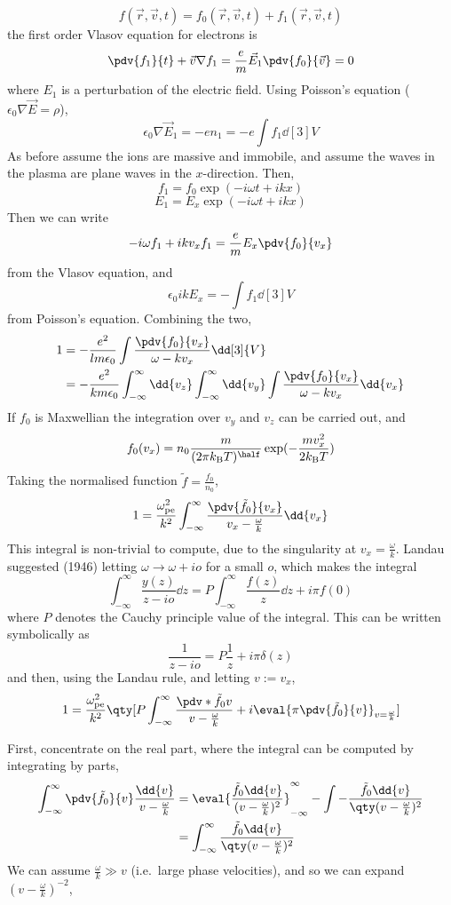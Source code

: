 \documentclass{book}         		                %
\begin{document}
\[ f(\vec{r}, \vec{v}, t) = f_0(\vec{r}, \vec{v}, t) + f_1(\vec{r},
\vec{v}, t) \]
the first order Vlasov equation for electrons is 
\[ \pdv{f_1}{t} + \vec{v} \nabla f_1 = \frac{e}{m} \vec{E}_1
\pdv{f_0}{\vec{v}} =0 \] where $E_1$ is a perturbation of the electric
field. Using Poisson's equation ($\epsilon_0 \nabla \vec{E} = \rho$),
\[ \epsilon_0 \nabla \vec{E}_1 = -e n_1 = -e \int f_1 \dd[3]{V} \] As
before assume the ions are massive and immobile, and assume the waves
in the plasma are plane waves in the $x$-direction. Then,
\[ f_1 = f_0 \exp(- i \omega t + i k x) \]
\[ E_1 = E_x \exp( - i \omega t + i k x) \]
Then we can write
\[ - i \omega f_1 + i k v_x f_1 = \frac{e}{m} E_x \pdv{f_0}{v_x} \]
from the Vlasov equation, and
\[ \epsilon_0 i k E_x = - \int f_1 \dd[3]{V} \]
from Poisson's equation. Combining the two,
\begin{align*}
  1 & = - \frac{e^2 }{l m \epsilon_0} \int \frac{\pdv{f_0}{v_x}}{\omega- k v_x} \dd[3]{V} \\
  &= - \frac{e^2}{k m \epsilon_0} \int_{-\infty}^{\infty} \dd{v_z}
  \int_{-\infty}^{\infty} \dd{v_y} \int \frac{\pdv{f_0}{v_x}}{\omega-
    k v_x} \dd{v_x}
\end{align*}
If $f_0$ is Maxwellian the integration over $v_y$ and $v_z$ can be carried out, and
\[ f_0(v_x) = n_0 \frac{m}{(2 \pi k_{\rm B} T)^{\half}} \exp( -
\frac{m v_x^2}{2 k_{\rm B} T} ) \] Taking the normalised function
$\tilde{f} = \frac{f_0}{n_0}$,
\[ 1 = \frac{\omega_{\rm pe}^2}{k^2} \int_{-\infty}^{\infty}
\frac{\pdv{\tilde{f}_0}{v_x}}{v_x - \frac{\omega}{k}} \dd{v_x} \] This
integral is non-trivial to compute, due to the singularity at $v_x =
\frac{\omega}{k}$. Landau suggested (1946) letting $\omega \to \omega
+ i o$ for a small $o$, which makes the integral
\[ \int_{-\infty}^{\infty} \frac{y(z)}{z-io} \dd{z} = P
\int_{-\infty}^{\infty} \frac{f(z)}{z} \dd{z} + i \pi f(0)\] where $P$
denotes the Cauchy principle value of the integral. This can be written symbolically as
\[ \frac{1}{z-io} = P \frac{1}{z} + i \pi \delta(z) \]
and then, using the Landau rule, and letting $v := v_x$,
\begin{equation}
  \label{eq:31}
  1 = \frac{\omega_{\rm pe}^2}{k^2} \qty[ P \int_{-\infty}^{\infty} \frac{\pdv*{\tilde{f}_0}{v}}{v - \frac{\omega}{k}} + i\eval{\pi \pdv{\tilde{f}_0}{v} }_{v = \frac{\omega}{k}}]
\end{equation}

First, concentrate on the real part, where the integral can be
computed by integrating by parts,
\begin{align*} 
\int_{-\infty}^{\infty} \pdv{\tilde{f}_0}{v} \frac{\dd{v}}{v - \frac{\omega}{k}} 
&= \eval{\frac{\tilde{f}_0 \dd{v}}{(v - \frac{\omega}{k})^2}}_{-\infty}^{\infty} - \int - \frac{\tilde{f}_0 \dd{v}}{\qty(v - \frac{\omega}{k})^2} \\ 
&= \int_{-\infty}^{\infty} \frac{\tilde{f}_0 \dd{v}}{\qty( v - \frac{\omega}{k})^2}
\end{align*}
We can assume $\frac{\omega}{k} \gg v$ (i.e.\ large phase velocities),
and so we can expand $(v - \frac{\omega}{k})^{-2}$,
\end{document}
